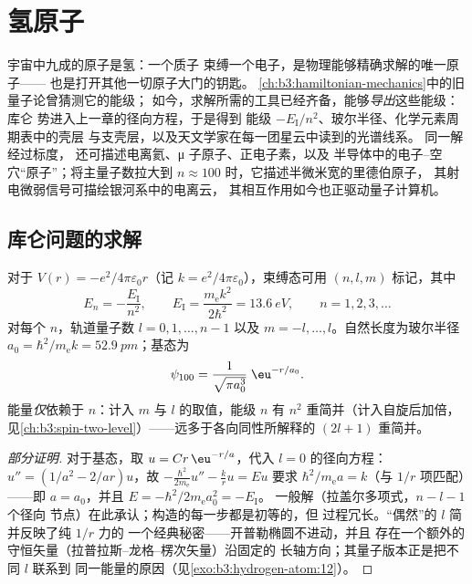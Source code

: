 \chapter{氢原子}\label{ch:b3:hydrogen-atom}

宇宙中九成的原子是氢：一个质子
束缚一个电子，是物理能够精确求解的唯一原子——
也是打开其他一切原子大门的钥匙。
\cref{ch:b3:hamiltonian-mechanics}中的旧量子论曾猜测它的能级；
如今，求解所需的工具已经齐备，能够\emph{导出}这些能级：库仑
势进入上一章的径向方程，于是得到
能级 $-E_{\text{I}}/n^2$、玻尔半径、化学元素周期表中的壳层
与支壳层，以及天文学家在每一团星云中读到的光谱线系。
同一解经过标度，
还可描述电离氦、μ 子原子、正电子素，以及
半导体中的电子–空穴“原子”；将主量子数拉大到 $n
\approx 100$ 时，它描述半微米宽的里德伯原子，
其射电微弱信号可描绘银河系中的电离云，
其相互作用如今也正驱动量子计算机。

\section{库仑问题的求解}

\begin{theorem}[氢原子的能级]\label{thm:b3:hydrogen-atom:levels}
对于 $V(r) = -e^2/4\pi\varepsilon_0 r$（记 $k = e^2/4\pi
\varepsilon_0$），束缚态可用 $(n, l, m)$ 标记，其中
\[
E_n = -\frac{E_{\text{I}}}{n^2} , \qquad
E_{\text{I}} = \frac{m_{\text{e}}k^2}{2\hbar^2} = \qty{13.6}{eV} ,
\qquad n = 1, 2, 3, \dots
\]
对每个 $n$，轨道量子数 $l = 0, 1, \dots, n-1$ 以及
$m = -l, \dots, l$。自然长度为玻尔半径 $a_0 =
\hbar^2/m_{\text{e}}k = \qty{52.9}{pm}$；基态为
\[
\psi_{100} = \frac{1}{\sqrt{\pi a_0^3}}\;\eu^{-r/a_0} .
\]
能量\emph{仅}依赖于 $n$：计入 $m$ 与
$l$ 的取值，能级 $n$ 有 $n^2$ 重简并（计入自旋后加倍，
见\cref{ch:b3:spin-two-level}）——远多于各向同性所解释的
$(2l+1)$ 重简并。
\end{theorem}

\begin{proof}[部分证明]
对于基态，取 $u = Cr\,\eu^{-r/a}$，代入
$l = 0$ 的径向方程：$u'' = (1/a^2 - 2/ar)u$，故
$-\tfrac{\hbar^2}{2m_{\text{e}}}u'' - \tfrac kr u = Eu$ 要求
$\hbar^2/m_{\text{e}}a = k$（与 $1/r$ 项匹配）——即
$a = a_0$，并且 $E = -\hbar^2/2m_{\text{e}}a_0^2 = -E_{\text{I}}$。
一般解（拉盖尔多项式，$n - l - 1$ 个径向
节点）在此承认；构造的每一步都是初等的，但
过程冗长。“偶然”的 $l$ 简并反映了纯 $1/r$ 力的
一个经典秘密——开普勒椭圆不进动，并且
存在一个额外的守恒矢量（拉普拉斯–龙格–楞次矢量）沿固定的
长轴方向；其量子版本正是把不同 $l$ 联系到
同一能量的原因（见\cref{exo:b3:hydrogen-atom:12}）。
\end{proof}

